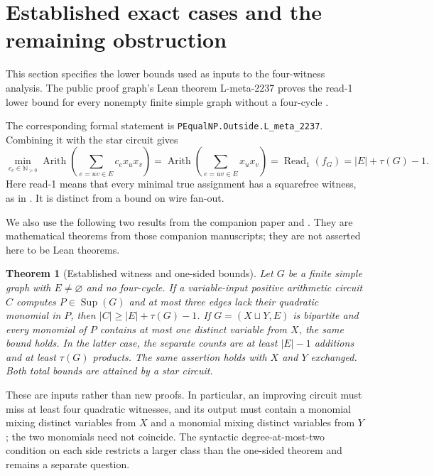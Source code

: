 \documentclass[11pt]{article}
\DeclareMathOperator{\Arith}{Arith}
\DeclareMathOperator{\Sup}{Sup}
\newtheorem{theorem}{Theorem}[section]
\theoremstyle{definition}
\begin{document}
\section{Established exact cases and the remaining obstruction}
This section specifies the lower bounds used as inputs to the four-witness analysis.
The public proof graph's Lean theorem L-meta-2237 proves the read-1 lower bound for every nonempty finite simple graph without a four-cycle \citep{Fleet}.

The corresponding formal statement is \mbox{\nolinkurl{PEqualNP.Outside.L_meta_2237}}.
Combining it with the star circuit gives
\[
 \min_{c_e\in\mathbb N_{>0}}\Arith\!\left(\sum_{e=uv\in E}c_e x_ux_v\right)
 =\Arith\!\left(\sum_{e=uv\in E}x_ux_v\right)
 =\operatorname{Read}_1(f_G)=|E|+\tau(G)-1.
\]
Here read-1 means that every minimal true assignment has a squarefree witness, as in \citet[Definition~1, p.~8; Theorem~1]{JuknaRead}. It is distinct from a bound on wire fan-out.

We also use the following two results from the companion paper \citep[Theorem~1.3]{Companion} and \citep[Theorem~1.1]{OneSidedCompanion}. They are mathematical theorems from those companion manuscripts; they are not asserted here to be Lean theorems.
\begin{theorem}[Established witness and one-sided bounds]\label{thm:granted}
Let $G$ be a finite simple graph with $E\ne\varnothing$ and no four-cycle.
If a variable-input positive arithmetic circuit $C$ computes $P\in\Sup(G)$ and at most three edges lack their quadratic monomial in $P$, then
$|C|\geq|E|+\tau(G)-1$.
If $G=(X\sqcup Y,E)$ is bipartite and every monomial of $P$ contains at most one distinct variable from $X$, the same bound holds. In the latter case, the separate counts are at least $|E|-1$ additions and at least $\tau(G)$ products. The same assertion holds with $X$ and $Y$ exchanged.
Both total bounds are attained by a star circuit.
\end{theorem}
These are inputs rather than new proofs. In particular, an improving circuit must miss at least four quadratic witnesses, and its output must contain a monomial mixing distinct variables from $X$ and a monomial mixing distinct variables from $Y$; the two monomials need not coincide.
The syntactic degree-at-most-two condition on each side restricts a larger class than the one-sided theorem and remains a separate question.

















\end{document}
